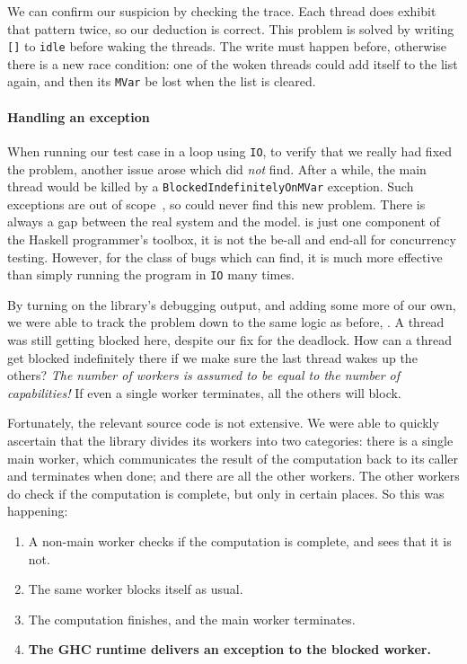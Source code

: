 We can confirm our suspicion by checking the trace.  Each thread does
exhibit that pattern twice, so our deduction is correct.  This problem
is solved by writing \verb|[]| to \verb|idle| before waking the
threads.  The write must happen before, otherwise there is a new race
condition: one of the woken threads could add itself to the list
again, and then its \verb|MVar| be lost when the list is cleared.

\paragraph{Handling an exception}
When running our test case in a loop using \verb|IO|, to verify that
we really had fixed the problem, another issue arose which \dejafu{}
did \emph{not} find.  After a while, the main thread would be killed
by a \verb|BlockedIndefinitelyOnMVar| exception.  Such exceptions are
out of scope~, so \dejafu{} could never find
this new problem.  There is always a gap between the real system and
the model.  \dejafu{} is just one component of the Haskell
programmer's toolbox, it is not the be-all and end-all for concurrency
testing.  However, for the class of bugs which \dejafu{} can find, it
is much more effective than simply running the program in \verb|IO|
many times.

By turning on the library's debugging output, and adding some more of
our own, we were able to track the problem down to the same logic as
before, .  A thread was still getting
blocked here, despite our fix for the deadlock.  How can a thread get
blocked indefinitely there if we make sure the last thread wakes up
the others?  \emph{The number of workers is assumed to be equal to the
  number of capabilities!}  If even a single worker terminates, all
the others will block.

Fortunately, the relevant source code is not extensive.  We were able
to quickly ascertain that the library divides its workers into two
categories: there is a single main worker, which communicates the
result of the computation back to its caller and terminates when done;
and there are all the other workers.  The other workers do check if
the computation is complete, but only in certain places.  So this was
happening:

\begin{enumerate}
\item A non-main worker checks if the computation is complete, and
  sees that it is not.
\item The same worker blocks itself as usual.
\item The computation finishes, and the main worker terminates.
\item \textbf{The GHC runtime delivers an exception to the blocked
    worker.}
\end{enumerate}


